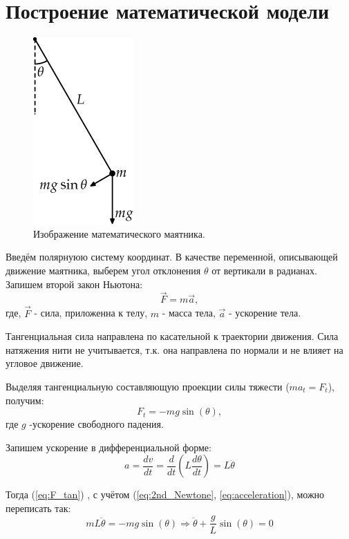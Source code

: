 \chapter{Построение математической модели}
\begin{figure}[h]  %
	\centering
	\includegraphics[height=0.3\textwidth]{imgs/pendulum_model.png}  %
	\caption{Изображение математического маятника.}  %
	\label{fig:pendulum}  %
\end{figure}

Введём полярнуюю систему координат. В качестве переменной, описывающей движение маятника, выберем угол отклонения $\theta$ от вертикали в радианах. Запишем второй закон Ньютона:
\begin{equation}
	\overrightarrow{F} = m \overrightarrow{a},
	\label{eq:2nd_Newtone}
\end{equation}
где, $\overrightarrow{F}$ - сила, приложенна к телу, $m$ - масса тела, $\overrightarrow{a}$ - ускорение тела.

Тангенциальная сила направлена по касательной к траектории движения. Сила натяжения нити не учитывается, т.к. она направлена по нормали  и не влияет на угловое движение.

Выделяя тангенциальную составляющую проекции силы тяжести ($ma_t = F_t$), получим:
\begin{equation}
	F_t = - mg\sin(\theta),
	\label{eq:F_tan}
\end{equation}
где $g$ -ускорение свободного падения.

Запишем ускорение в дифференциальной форме:
\begin{equation}
	a = \frac{dv}{dt} = \frac{d}{dt}\left(L\frac{d\theta}{dt}\right) = L \ddot{\theta}
	\label{eq:acceleration}
\end{equation}

Тогда (\ref{eq:F_tan}) , с учётом (\ref{eq:2nd_Newtone}, \ref{eq:acceleration}), можно переписать так:
\begin{equation}
	mL\ddot{\theta} = -mg\sin(\theta) \Rightarrow \ddot{\theta} +\frac{g}{L}\sin(\theta) = 0 
	\label{eq:base_model}
\end{equation}

